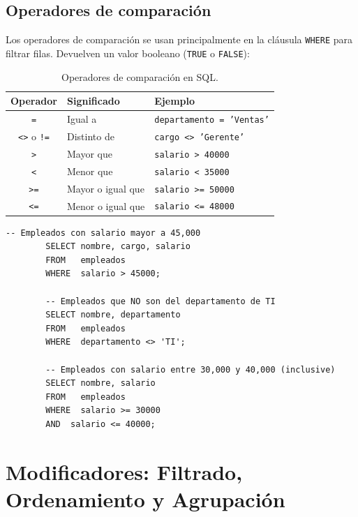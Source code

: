 \documentclass[12pt, a4paper]{article}
\begin{document}
	\subsection{Operadores de comparación}
	
	Los operadores de comparación se usan principalmente en la cláusula
	\texttt{WHERE} para filtrar filas.
	Devuelven un valor booleano (\texttt{TRUE} o \texttt{FALSE}):
	
	\begin{table}[H]
		\centering
		\small
		\renewcommand{\arraystretch}{1.4}
		\begin{tabularx}{\linewidth}{@{} c l X @{}}
			\toprule
			\textbf{Operador} & \textbf{Significado} & \textbf{Ejemplo} \\
			\midrule
			\texttt{=}    & Igual a              & \texttt{departamento = 'Ventas'} \\
			\texttt{<>} o \texttt{!=} & Distinto de & \texttt{cargo <> 'Gerente'} \\
			\texttt{>}    & Mayor que            & \texttt{salario > 40000} \\
			\texttt{<}    & Menor que            & \texttt{salario < 35000} \\
			\texttt{>=}   & Mayor o igual que    & \texttt{salario >= 50000} \\
			\texttt{<=}   & Menor o igual que    & \texttt{salario <= 48000} \\
			\bottomrule
		\end{tabularx}
		\caption{Operadores de comparación en SQL.}
		\label{tab:operadores-comparacion}
	\end{table}
	
	\begin{lstlisting}[caption={Filtros con operadores de comparación.}]
		-- Empleados con salario mayor a 45,000
		SELECT nombre, cargo, salario
		FROM   empleados
		WHERE  salario > 45000;
		
		-- Empleados que NO son del departamento de TI
		SELECT nombre, departamento
		FROM   empleados
		WHERE  departamento <> 'TI';
		
		-- Empleados con salario entre 30,000 y 40,000 (inclusive)
		SELECT nombre, salario
		FROM   empleados
		WHERE  salario >= 30000
		AND  salario <= 40000;
	\end{lstlisting}
	
	\section{Modificadores: Filtrado, Ordenamiento y Agrupación}
	
\end{document}
